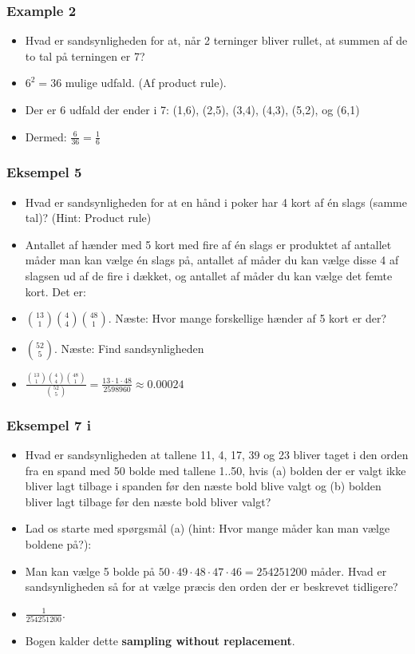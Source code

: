 \documentclass{beamer}
\begin{document}
\begin{frame}
  \frametitle{Example 2}
 \begin{itemize}
 \item<1-> Hvad er sandsynligheden for at, når 2 terninger bliver rullet, at summen af de to tal på terningen er 7?
 \item<1-> $6^2 = 36$ mulige udfald. (Af product rule).
 \item<2-> Der er 6 udfald der ender i 7: (1,6), (2,5), (3,4), (4,3), (5,2), og (6,1)
   \item<3-> Dermed: $\frac{6}{36} = \frac{1}{6}$
 \end{itemize} 
\end{frame}

\begin{frame}
  \frametitle{Eksempel 5}
\begin{itemize}
\item<1-> Hvad er sandsynligheden for at en hånd i poker har 4 kort af én slags (samme tal)? (Hint: Product rule)
\item<2-> Antallet af hænder med 5 kort med fire af én slags er produktet af antallet måder man kan vælge én slags på, antallet af måder du kan vælge disse 4 af slagsen ud af de fire i dækket, og antallet af måder du kan vælge det femte kort. Det er:
\item<3-> $\binom{13}{1}\binom{4}{4}\binom{48}{1}$. Næste: Hvor mange forskellige hænder af 5 kort er der? 
\item<4-> $\binom{52}{5}$. Næste: Find sandsynligheden
  \item<5-> $\frac{\binom{13}{1}\binom{4}{4}\binom{48}{1}}{\binom{52}{5}}= \frac{13 \cdot 1 \cdot 48}{2598960} \approx 0.00024$
\end{itemize}  
\end{frame}

\begin{frame}
  \frametitle{Eksempel 7 i}
 \begin{itemize}
 \item<1-> Hvad er sandsynligheden at tallene 11, 4, 17, 39 og 23 bliver taget i den orden fra en spand med 50 bolde med tallene 1..50, hvis (a) bolden der er valgt ikke bliver lagt tilbage i spanden før den næste bold blive valgt og (b) bolden bliver lagt tilbage før den næste bold bliver valgt?
 \item<1-> Lad os starte med spørgsmål (a) (hint: Hvor mange måder kan man vælge boldene på?):
 \item<2-> Man kan vælge 5 bolde på $50 \cdot 49 \cdot 48 \cdot 47 \cdot 46 = 254251200$ måder. Hvad er sandsynligheden så for at vælge præcis den orden der er beskrevet tidligere?
 \item<3-> $\frac{1}{254251200}$.
   \item<3-> Bogen kalder dette \textbf{sampling without replacement}.
 \end{itemize} 
\end{frame}
\end{document}
